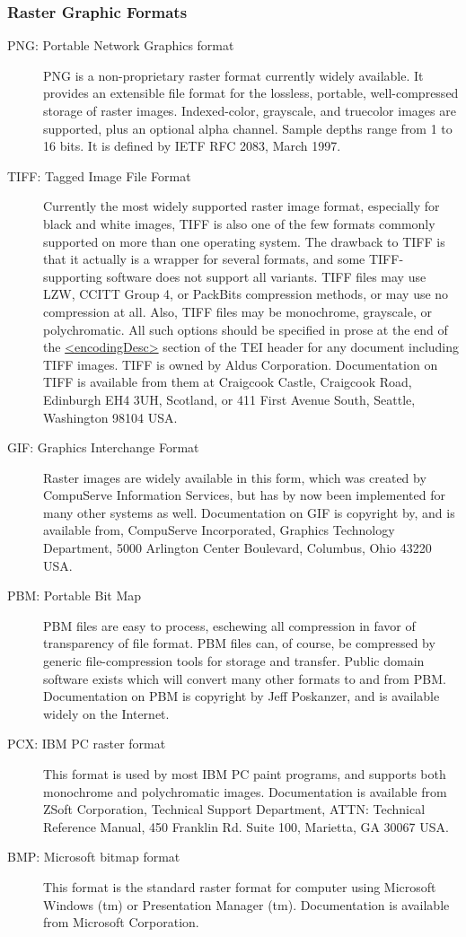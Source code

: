 \subsubsection[{Raster Graphic Formats}]{Raster Graphic Formats}\label{FTGRARGF}\begin{description}

\item[{PNG: Portable Network Graphics format}]PNG is a non-proprietary raster format currently widely available. It provides an extensible file format for the lossless, portable, well-compressed storage of raster images. Indexed-color, grayscale, and truecolor images are supported, plus an optional alpha channel. Sample depths range from 1 to 16 bits. It is defined by IETF RFC 2083, March 1997. 
\item[{TIFF: Tagged Image File Format}]Currently the most widely supported raster image format, especially for black and white images, TIFF is also one of the few formats commonly supported on more than one operating system. The drawback to TIFF is that it actually is a wrapper for several formats, and some TIFF-supporting software does not support all variants. TIFF files may use LZW, CCITT Group 4, or PackBits compression methods, or may use no compression at all. Also, TIFF files may be monochrome, grayscale, or polychromatic. All such options should be specified in prose at the end of the \hyperref[TEI.encodingDesc]{<encodingDesc>} section of the TEI header for any document including TIFF images. TIFF is owned by Aldus Corporation. Documentation on TIFF is available from them at Craigcook Castle, Craigcook Road, Edinburgh EH4 3UH, Scotland, or 411 First Avenue South, Seattle, Washington 98104 USA.
\item[{GIF: Graphics Interchange Format}]Raster images are widely available in this form, which was created by CompuServe Information Services, but has by now been implemented for many other systems as well. Documentation on GIF is copyright by, and is available from, CompuServe Incorporated, Graphics Technology Department, 5000 Arlington Center Boulevard, Columbus, Ohio 43220 USA. 
\item[{PBM: Portable Bit Map}]PBM files are easy to process, eschewing all compression in favor of transparency of file format. PBM files can, of course, be compressed by generic file-compression tools for storage and transfer. Public domain software exists which will convert many other formats to and from PBM. Documentation on PBM is copyright by Jeff Poskanzer, and is available widely on the Internet. 
\item[{PCX: IBM PC raster format}]This format is used by most IBM PC paint programs, and supports both monochrome and polychromatic images. Documentation is available from ZSoft Corporation, Technical Support Department, ATTN: Technical Reference Manual, 450 Franklin Rd. Suite 100, Marietta, GA 30067 USA. 
\item[{BMP: Microsoft bitmap format}]This format is the standard raster format for computer using Microsoft Windows (tm) or Presentation Manager (tm). Documentation is available from Microsoft Corporation. 
\end{description} 
